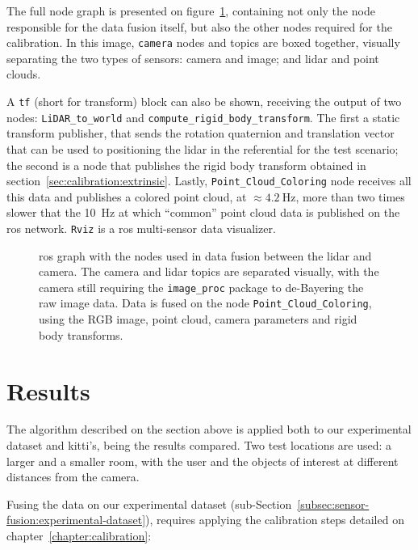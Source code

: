 The full node graph is presented on figure~\ref{fig:sensor-fusion-rosgraph}, containing not only the node responsible for the data fusion itself, but also the other nodes required for the calibration. In this image, \texttt{camera} nodes and topics are boxed together, visually separating the two types of sensors: camera and image; and \ac{lidar} and point clouds.

A \texttt{tf} (short for transform) block can also be shown, receiving the output of two nodes: \texttt{LiDAR\_to\_world} and \texttt{compute\_rigid\_body\_transform}. The first a static transform publisher, that sends the rotation quaternion and translation vector that can be used to positioning the \ac{lidar} in the referential for the test scenario; the second is a node that publishes the rigid body transform obtained in section~\ref{sec:calibration:extrinsic}. Lastly, \texttt{Point\_Cloud\_Coloring} node receives all this data and publishes a colored point cloud, at $\approx \SI{4.2}{\hertz}$, more than two times slower that the \SI{10}{\hertz} at which ``common'' point cloud data is published on the \ac{ros} network. \texttt{Rviz} is a \ac{ros} multi-sensor data visualizer.


\begin{figure}[!ht]
	\centering
	\def\svgwidth{\columnwidth}
	\graphicspath{{img/sensor_fusion/}}
		
		\caption{\ac{ros} graph with the nodes used in data fusion between the \ac{lidar} and camera. The camera and \ac{lidar} topics are separated visually, with the camera still requiring the \texttt{image\_proc} package to de-Bayering the raw image data. Data is fused on the node \texttt{Point\_Cloud\_Coloring}, using the RGB image, point cloud, camera parameters and rigid body transforms.}
	\label{fig:sensor-fusion-rosgraph}
\end{figure}


\section{Results}
The algorithm described on the section above is applied both to our experimental dataset and \ac{kitti}'s, being the results compared. Two test locations are used: a larger and a smaller room, with the user and the objects of interest at different distances from the camera.

Fusing the data on our experimental dataset (sub-Section~\ref{subsec:sensor-fusion:experimental-dataset}), requires applying the calibration steps detailed on chapter~\ref{chapter:calibration}:

